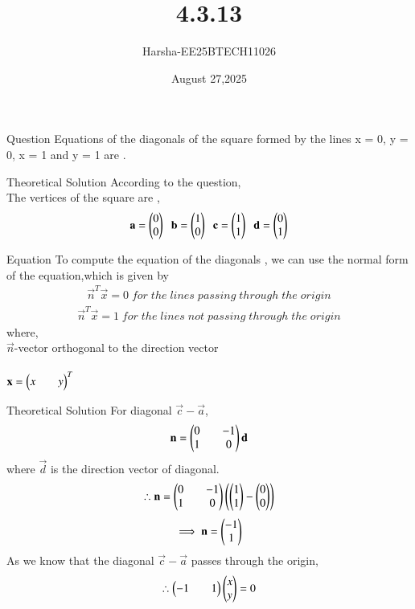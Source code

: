 \documentclass{beamer}
\title %
{4.3.13}
\date{August 27,2025}
\author %
{Harsha-EE25BTECH11026}
\begin{document}
\frame{\titlepage}
\begin{frame}{Question}
Equations of the diagonals of the square formed by the lines x = 0, y = 0, x = 1 and y = 1 are \underline{\hspace{2cm}}.
\end{frame}

\begin{frame}{Theoretical Solution}
According to the question,\\
The vertices of the square are ,
\begin{align*}
    \mathbf{a}=\begin{pmatrix}0\\0\end{pmatrix}\;\;\mathbf{b}=\begin{pmatrix}1\\0\end{pmatrix}\;\;\mathbf{c}=\begin{pmatrix}1\\1\end{pmatrix}\;\;\mathbf{d}=\begin{pmatrix}0\\1\end{pmatrix}
\end{align*}
\end{frame}

\begin{frame}{Equation}
To compute the equation of the diagonals , we can use the normal form of the equation,which is given by
\begin{align*}
    \vec{n}^T\vec{x}=0 \;for \;the \;lines \;passing\;through \;the \;origin
\end{align*}
\begin{align*}
    \vec{n}^T\vec{x}=1 \;for \;the \;lines \;not \;passing\;through \;the \;origin
\end{align*}
where,\\
\hspace*{4em}  $\vec{n}$-vector orthogonal to the direction vector\\
\\
\hspace*{4em}  $\mathbf{x}=\begin{pmatrix}x&&y\end{pmatrix}^T$
\end{frame}

\begin{frame}{Theoretical Solution}
For diagonal $\vec{c}-\vec{a}$,
\begin{align*}
    \mathbf{n}=\begin{pmatrix}0&&-1\\1&&0\end{pmatrix}\mathbf{d}
\end{align*}
where $\vec{d}$ is the direction vector of diagonal.
\begin{align*}
    \therefore \mathbf{n}=\begin{pmatrix}0&&-1\\1&&0\end{pmatrix}\left(\begin{pmatrix}1\\1\end{pmatrix}-\begin{pmatrix}0\\0\end{pmatrix}\right)
\end{align*}
\begin{align*}
    \implies \mathbf{n}=\begin{pmatrix}-1\\1\end{pmatrix}
\end{align*}
As we know that the diagonal $\vec{c}-\vec{a}$ passes through the origin,
\begin{align*}
    \therefore \begin{pmatrix}-1&&1\end{pmatrix}\begin{pmatrix}x\\y\end{pmatrix}=0
\end{align*}
\end{frame}
\end{document}

